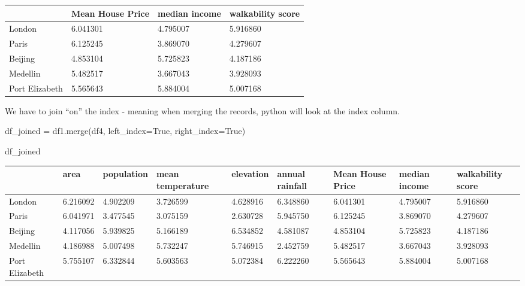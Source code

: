 \documentclass[
  letterpaper,
  DIV=11,
  numbers=noendperiod]{scrreprt}
\newenvironment{Shaded}{\begin{snugshade}}{\end{snugshade}}
\newcommand{\NormalTok}[1]{\textcolor[rgb]{0.00,0.23,0.31}{#1}}
\newcommand{\OperatorTok}[1]{\textcolor[rgb]{0.37,0.37,0.37}{#1}}
\newcommand{\VariableTok}[1]{\textcolor[rgb]{0.07,0.07,0.07}{#1}}
\begin{document}
\begin{longtable}[]{@{}llll@{}}
\toprule\noalign{}
& Mean House Price & median income & walkability score \\
\midrule\noalign{}
\endhead
\bottomrule\noalign{}
\endlastfoot
London & 6.041301 & 4.795007 & 5.916860 \\
Paris & 6.125245 & 3.869070 & 4.279607 \\
Beijing & 4.853104 & 5.725823 & 4.187186 \\
Medellin & 5.482517 & 3.667043 & 3.928093 \\
Port Elizabeth & 5.565643 & 5.884004 & 5.007168 \\
\end{longtable}

We have to join ``on'' the index - meaning when merging the records,
python will look at the index column.

\begin{Shaded}
\begin{Highlighting}[]
\NormalTok{df\_joined }\OperatorTok{=}\NormalTok{ df1.merge(df4, left\_index}\OperatorTok{=}\VariableTok{True}\NormalTok{, right\_index}\OperatorTok{=}\VariableTok{True}\NormalTok{)}
\end{Highlighting}
\end{Shaded}

\begin{Shaded}
\begin{Highlighting}[]
\NormalTok{df\_joined}
\end{Highlighting}
\end{Shaded}

\begin{longtable}[]{@{}lllllllll@{}}
\toprule\noalign{}
& area & population & mean temperature & elevation & annual rainfall &
Mean House Price & median income & walkability score \\
\midrule\noalign{}
\endhead
\bottomrule\noalign{}
\endlastfoot
London & 6.216092 & 4.902209 & 3.726599 & 4.628916 & 6.348860 & 6.041301
& 4.795007 & 5.916860 \\
Paris & 6.041971 & 3.477545 & 3.075159 & 2.630728 & 5.945750 & 6.125245
& 3.869070 & 4.279607 \\
Beijing & 4.117056 & 5.939825 & 5.166189 & 6.534852 & 4.581087 &
4.853104 & 5.725823 & 4.187186 \\
Medellin & 4.186988 & 5.007498 & 5.732247 & 5.746915 & 2.452759 &
5.482517 & 3.667043 & 3.928093 \\
Port Elizabeth & 5.755107 & 6.332844 & 5.603563 & 5.072384 & 6.222260 &
5.565643 & 5.884004 & 5.007168 \\
\end{longtable}
\end{document}
